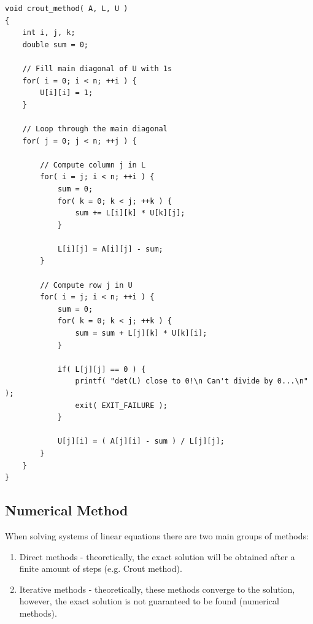 \begin{lstlisting}[caption={C++ pseudocode implementing Crout's matrix decomposition algorithm. It assumes that \code{A[n][n]} is a two-dimensional array that represents the invertible square coefficient matrix $ \mathbb{A} $; \code{L[n][n]} and \code{U[n][n]} are also two-dimensional arrays representing matrices $ \mathbb{L} $ and $ \mathbb{U} $ respectively. Furthermore, it is assumed that \code{L} and \code{U} are populated with zeros. Derived from \emph{Crout's LU Factorization} \cite{rqjYYJkSwERYYbSy}, \emph{Numerical recipes: the art of scientific computing} \cite{Press2007}, and \emph{Crout matrix decomposition} \cite{TgtpOw7zCHo3ii0m}.},label={Listing:theory-LU-decomposition-crout-method-pseudocode}]
void crout_method( A, L, U )
{
	int i, j, k;
	double sum = 0;
	
	// Fill main diagonal of U with 1s
	for( i = 0; i < n; ++i ) {
		U[i][i] = 1;
	}	

	// Loop through the main diagonal
	for( j = 0; j < n; ++j ) {
		
		// Compute column j in L
		for( i = j; i < n; ++i ) {
			sum = 0;
			for( k = 0; k < j; ++k ) {
				sum += L[i][k] * U[k][j];
			}

			L[i][j] = A[i][j] - sum;
		}
		
		// Compute row j in U
		for( i = j; i < n; ++i ) {
			sum = 0;
			for( k = 0; k < j; ++k ) {
				sum = sum + L[j][k] * U[k][i];
			}

			if( L[j][j] == 0 ) {
				printf( "det(L) close to 0!\n Can't divide by 0...\n" );
				exit( EXIT_FAILURE );
			}

			U[j][i] = ( A[j][i] - sum ) / L[j][j];
		}
	}
}
\end{lstlisting}


\subsection{Numerical Method}\label{Subsection:theory-LU-decomposition-numerical-method}
When solving systems of linear equations there are two main groups of methods:

\begin{enumerate}
	\item Direct methods - theoretically, the exact solution will be obtained after a finite amount of steps (e.g. Crout method).
	\item Iterative methods - theoretically, these methods converge to the solution, however, the exact solution is not guaranteed to be found (numerical methods).
\end{enumerate}

